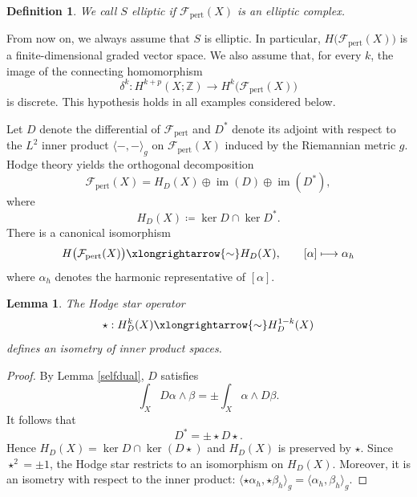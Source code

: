 \documentclass[12pt]{amsart}
\numberwithin{table}{section}
\numberwithin{equation}{section}
\newtheorem{defn}{Definition}[section]
\newtheorem{lem}{Lemma}[section]
\theoremstyle{plain}
\newcommand{\sF}{\mathcal{F}}
\newcommand{\sH}{\mathcal{H}}
\newcommand{\Z}{\mathbb{Z}}
\begin{document}
\begin{defn}
	We call $S$ \emph{elliptic} if $\sF_{\mathrm{pert}}(X)$ is an elliptic complex.
\end{defn}

From now on, we always assume that $S$ is elliptic. In particular, $H\bigl(\sF_{\mathrm{pert}}(X)\bigr)$ is a finite-dimensional graded vector space. We also assume that, for every $k$, the image of the connecting homomorphism
\[
\delta^k:H^{k+p}(X;\Z)\longrightarrow H^k\!\bigl(\sF_{\mathrm{pert}}(X)\bigr)
\]
is discrete. This hypothesis holds in all examples considered below.

Let $D$ denote the differential of $\sF_{\mathrm{pert}}$ and $D^*$ denote its adjoint with respect to the $L^2$ inner product $\langle -, - \rangle_g$ on $\sF_{\mathrm{pert}}(X)$ induced by the Riemannian metric $g$. Hodge theory yields the orthogonal decomposition
\[
\sF_{\mathrm{pert}}(X) = H_D(X) \oplus \operatorname{im}(D) \oplus \operatorname{im}(D^*),
\]
where
\[
 H_D(X) \coloneqq \ker D \cap \ker D^*.
\]
There is a canonical isomorphism
\[
H\bigl(\sF_{\mathrm{pert}}(X)\bigr) \xlongrightarrow{\sim}  H_D(X), \qquad [\alpha] \longmapsto \alpha_h
\] 
where $\alpha_h$ denotes the harmonic representative of $[\alpha]$.

\begin{lem}\label{star}
	The Hodge star operator
	\[
	\star: H_D^k(X) \xlongrightarrow{\sim} H_D^{1-k}(X)
	\]
	defines an isometry of inner product spaces.
\end{lem}
\begin{proof}
	By Lemma \ref{selfdual}, $D$ satisfies
	\[
	\int_X D \alpha \wedge \beta = \pm \int_X \alpha \wedge D \beta.
	\]
	It follows that
	\[
	D^*=\pm \star D\star.
	\]
	Hence $H_D(X)=\ker D\cap\ker(D\star)$ and $H_D(X)$ is preserved by $\star$. Since $\star^2=\pm 1$, the Hodge star restricts to an isomorphism on $H_D(X)$. Moreover, it is an isometry with respect to the inner product:
	$
	\langle \star\alpha_h,\star\beta_h\rangle_g
	=
	\langle \alpha_h,\beta_h\rangle_g.
	$
\end{proof}
\end{document}
